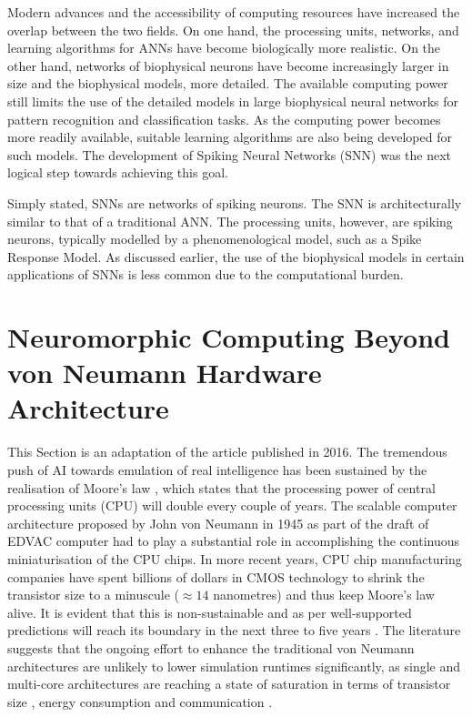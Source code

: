 Modern advances and the accessibility of computing resources have increased the overlap between the two fields. On one hand, the processing units, networks, and learning algorithms for ANNs have
become biologically more realistic. On the other hand, networks of biophysical neurons have become increasingly larger in size and the biophysical models, more detailed. The available computing power still limits the use of the detailed models in large biophysical neural networks for pattern recognition and classification tasks. As the computing power becomes more readily available, suitable learning algorithms are also being developed for such models. The development of Spiking Neural Networks (SNN) was the next logical step towards achieving this goal.

Simply stated, SNNs are networks of spiking neurons. The SNN is architecturally similar to that of a traditional ANN. The processing units, however, are spiking neurons, typically modelled by a phenomenological model, such as a Spike Response Model. As discussed earlier, the use of the biophysical models in certain applications of SNNs is less common due to the computational burden.

\section{Neuromorphic Computing Beyond von Neumann Hardware Architecture}

This Section is an adaptation of the article \citep{kasabov2016neumann} published  in 2016. The tremendous push of AI towards emulation of real intelligence has been sustained by the realisation of Moore's law \citep{schaller1997moore}, which states that the processing power of central processing units (CPU) will double every couple of years. The scalable computer architecture proposed by John von Neumann in 1945 as part of the draft of EDVAC computer \citep{randell2013origins} had to play a substantial role in accomplishing the continuous miniaturisation of the CPU chips. In more recent years, CPU chip manufacturing companies have spent billions of dollars in CMOS technology to shrink the transistor size to a minuscule ($\approx 14$ nanometres) and thus keep Moore's law alive. It is evident that this is non-sustainable and as per well-supported predictions will reach its boundary in the next three to five years \citep{toumey2016less}. The literature suggests that the ongoing effort to enhance the traditional von Neumann architectures are unlikely to lower simulation runtimes significantly, as single and multi-core architectures are reaching a state of saturation in terms of transistor size \citep{thompson2006moore}, energy consumption \citep{esmaeilzadeh2011dark} and communication \citep{perrin2011complexity}. 

